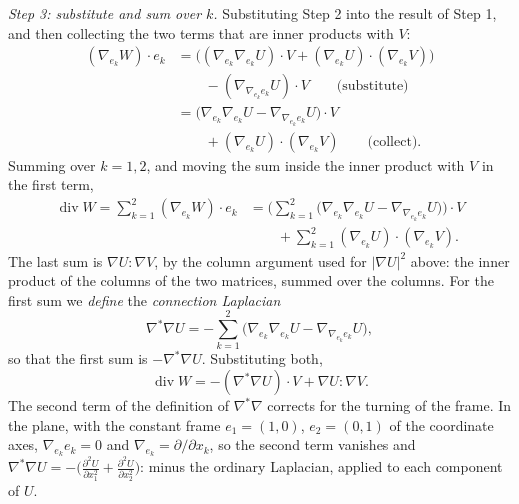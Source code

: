 \emph{Step 3: substitute and sum over $k$.} Substituting Step 2 into the result of Step 1, and then collecting the two terms that are inner products with $V$:
\begin{align*}
(\nabla_{e_k} W)\cdot e_k &= \Big( (\nabla_{e_k}\nabla_{e_k} U)\cdot V + (\nabla_{e_k} U) \cdot (\nabla_{e_k} V) \Big) \\
&\qquad - (\nabla_{\nabla_{e_k} e_k} U)\cdot V \qquad \text{(substitute)} \\
&= \big( \nabla_{e_k}\nabla_{e_k} U - \nabla_{\nabla_{e_k} e_k} U \big)\cdot V \\
&\qquad + (\nabla_{e_k} U) \cdot (\nabla_{e_k} V) \qquad \text{(collect)} .
\end{align*}
Summing over $k = 1, 2$, and moving the sum inside the inner product with $V$ in the first term,
\begin{align*}
\operatorname{div} W = \sum_{k=1}^2 (\nabla_{e_k} W)\cdot e_k &= \Big( \sum_{k=1}^2 \big( \nabla_{e_k}\nabla_{e_k} U - \nabla_{\nabla_{e_k} e_k} U \big) \Big)\cdot V \\
&\qquad + \sum_{k=1}^2 (\nabla_{e_k} U) \cdot (\nabla_{e_k} V) .
\end{align*}
The last sum is $\nabla U : \nabla V$, by the column argument used for $|\nabla U|^2$ above: the inner product of the columns of the two matrices, summed over the columns. For the first sum we \emph{define} the \emph{connection Laplacian}
\begin{equation*}
\nabla^* \nabla U = -\sum_{k=1}^2 \big( \nabla_{e_k} \nabla_{e_k} U - \nabla_{\nabla_{e_k} e_k} U \big),
\end{equation*}
so that the first sum is $-\nabla^*\nabla U$. Substituting both,
\begin{equation*}
\operatorname{div} W = -(\nabla^* \nabla U) \cdot V + \nabla U : \nabla V .
\end{equation*}
The second term of the definition of $\nabla^*\nabla$ corrects for the turning of the frame. In the plane, with the constant frame $e_1 = (1, 0)$, $e_2 = (0, 1)$ of the coordinate axes, $\nabla_{e_k} e_k = 0$ and $\nabla_{e_k} = \partial/\partial x_k$, so the second term vanishes and $\nabla^*\nabla U = -\big(\frac{\partial^2 U}{\partial x_1^2} + \frac{\partial^2 U}{\partial x_2^2}\big)$: minus the ordinary Laplacian, applied to each component of $U$.

